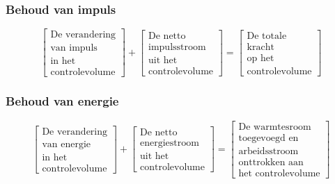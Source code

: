 \documentclass[t]{beamer}
\begin{document}
  		\begin{frame}
			\frametitle{Behoud van impuls}
			\vspace{1.5cm}
			\begin{equation}
				\left[
					\begin{array}{c}
						\mbox{De verandering} \\ \mbox{van impuls} \\ \mbox{in het}  \\ \mbox{controlevolume}
					\end{array}
				\right]
				+
				\left[
					\begin{array}{c}
						\mbox{De netto} \\ \mbox{impulsstroom} \\ \mbox{uit het} \\ \mbox{controlevolume}
					\end{array}
				\right]
				=
				\left[
					\begin{array}{c}
						\mbox{De totale} \\ \mbox{kracht} \\ \mbox{op het} \\ \mbox{controlevolume}
					\end{array}
				\right]
				\label{eqn:controlevolume,behoud van massa,woorden}
			\end{equation}
		\end{frame}	
  		\begin{frame}
			\frametitle{Behoud van energie}
			\vspace{1.3cm}
			\begin{equation}
				\left[
					\begin{array}{c}
						\mbox{De verandering} \\ \mbox{van energie} \\ \mbox{in het} \\ \mbox{controlevolume}
					\end{array}
				\right]
				+
				\left[
					\begin{array}{c}
						\mbox{De netto} \\ \mbox{energiestroom} \\ \mbox{uit het} \\ \mbox{controlevolume}
					\end{array}
				\right]
				=
				\left[
					\begin{array}{c}
						\mbox{De warmtesroom} \\ \mbox{toegevoegd en} \\   \mbox{arbeidsstroom} \\ \mbox{onttrokken aan } \\ \mbox{het controlevolume}
					\end{array}
				\right]
				\label{eqn:controlevolume,behoud van massa,woorden}
			\end{equation}
		\end{frame}	
\end{document}
